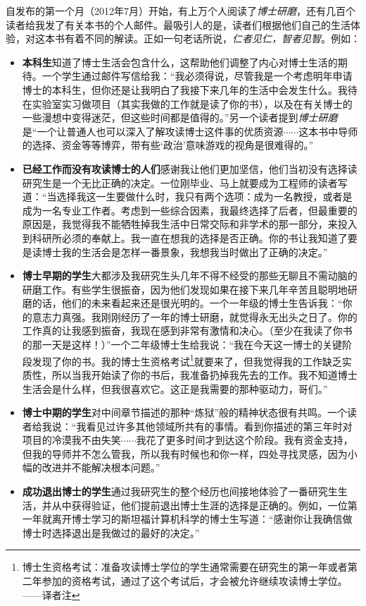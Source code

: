 \documentclass[letter,12pt]{book}
\newcommand{\bookname}{博士研磨}
\begin{document}
\begin{CJK}{UTF8}{gbsn}
自发布的第一个月（2012年7月）开始，有上万个人阅读了\emph{\bookname}，还有几百个读者给我发了有关本书的个人邮件。最吸引人的是，读者们根据他们自己的生活体验，对这本书有着不同的解读。正如一句老话所说，\emph{仁者见仁，智者见智}。例如：
\begin{itemize}
  \item \textbf{本科生}知道了博士生活会包含什么，这帮助他们调整了内心对博士生活的期待。一个学生通过邮件写信给我：“我必须得说，尽管我是一个考虑明年申请博士的本科生，但你还是让我明白了我接下来几年的生活中会发生什么。我待在实验室实习做项目（其实我做的工作就是读了你的书），以及在有关博士的一些漫想中变得迷茫，但这些时间都是值得的。”另一个读者提到\emph{\bookname}是“一个让普通人也可以深入了解攻读博士这件事的优质资源$\cdots\cdots$这本书中导师的选择、资金等等博弈，带有些‘政治’意味游戏的视角是很难得的。”
  \item \textbf{已经工作而没有攻读博士的人们}感谢我让他们更加坚信，他们当初没有选择读研究生是一个无比正确的决定。一位刚毕业、马上就要成为工程师的读者写道：“当选择我这一生要做什么时，我只有两个选项：成为一名教授，或者是成为一名专业工作者。考虑到一些综合因素，我最终选择了后者，但最重要的原因是，我觉得我不能牺牲掉我生活中日常交际和非学术的那一部分，来投入到科研所必须的奉献上。我一直在想我的选择是否正确。你的书让我知道了要是读博士我的生活会是怎样一番景象，我想我当时做出了正确的决定。”
  \item \textbf{博士早期的学生}大都涉及我研究生头几年不得不经受的那些无聊且不需动脑的研磨工作。有些学生很振奋，因为他们发现如果在接下来几年辛苦且聪明地研磨的话，他们的未来看起来还是很光明的。一个一年级的博士生告诉我：“你的意志力真强。我刚刚经历了一年的博士研磨，就觉得永无出头之日了。你的工作真的让我感到振奋，我现在感到非常有激情和决心。（至少在我读了你书的那一天是这样！）”一个二年级博士生给我说：“我在今天这一博士的关键阶段发现了你的书。我的博士生资格考试\footnote{博士生资格考试：准备攻读博士学位的学生通常需要在研究生的第一年或者第二年参加的资格考试，通过了这个考试后，才会被允许继续攻读博士学位。——译者注}就要来了，但我觉得我的工作缺乏实质性，所以当我开始读了你的书后，我准备扔掉我先去的工作。我不知道博士生活会是什么样，但我很喜欢它。这正是我需要的那种驱动力，哥们。”
  \item \textbf{博士中期的学生}对中间章节描述的那种“炼狱”般的精神状态很有共鸣。一个读者给我说：“我看见过许多其他领域所共有的事情。看到你描述的第三年时对项目的冷漠我不由失笑$\cdots\cdots$我花了更多时间才到达这个阶段。我有资金支持，但我的导师并不怎么管我，所以我有时候也和你一样，四处寻找灵感，因为小幅的改进并不能解决根本问题。”
  \item \textbf{成功退出博士的学生}通过我研究生的整个经历也间接地体验了一番研究生生活，并从中获得验证，他们提前退出博士生涯的选择是正确的。例如，一位第一年就离开博士学习的斯坦福计算机科学的博士生写道：“感谢你让我确信做博士时选择退出是我做过的最好的决定。”

\end{itemize}
\end{CJK}
\end{document}
